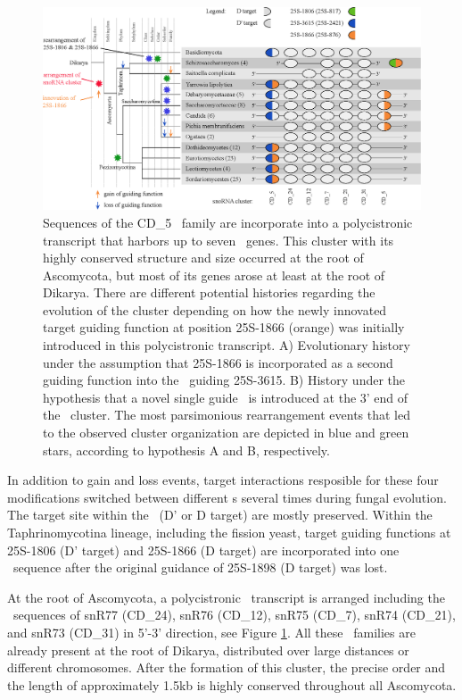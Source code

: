 \begin{figure}
  \centering
  \includegraphics[width=\textwidth]{pics/target_switches_CD_5_cluster.eps}
  \caption[Evolution of a \sno\ cluster harboring CD\_5
  sequences.]{Sequences of the CD\_5 \sno\ family are incorporate into
    a polycistronic transcript that harbors up to seven \sno\
    genes. This cluster with its highly conserved structure and size
    occurred at the root of Ascomycota, but most of its genes arose at
    least at the root of Dikarya. There are different potential
    histories regarding the evolution of the cluster depending on how
    the newly innovated target guiding function at position 25S-1866
    (orange) was initially introduced in this polycistronic
    transcript. A) Evolutionary history under the assumption that
    25S-1866 is incorporated as a second guiding function into the
    \sno\ guiding 25S-3615. B) History under the hypothesis that a
    novel single guide \sno\ is introduced at the 3' end of the \sno\
    cluster. The most parsimonious rearrangement events that led to
    the observed cluster organization are depicted in blue and green
    stars, according to hypothesis A and B, respectively.}
\label{fig:CD_5_cluster_history}
\end{figure}

In addition to gain and loss events, target interactions resposible for
these four modifications switched between different \sno s several times
during fungal evolution. The target site within the \sno\ (D' or D target)
are mostly preserved. Within the Taphrinomycotina lineage, including the
fission yeast, target guiding functions at 25S-1806 (D' target) and
25S-1866 (D target) are incorporated into one \sno\ sequence after the
original guidance of 25S-1898 (D target) was lost.

At the root of Ascomycota, a polycistronic \sno\ transcript is arranged
including the \sno\ sequences of snR77 (CD\_24), snR76 (CD\_12), snR75
(CD\_7), snR74 (CD\_21), and snR73 (CD\_31) in 5'-3' direction, see Figure
\ref{fig:CD_5_cluster_history}.  All these \sno\ families are already
present at the root of Dikarya, distributed over large distances or
different chromosomes. After the formation of this cluster, the precise
order and the length of approximately 1.5kb is highly conserved throughout
all Ascomycota.

